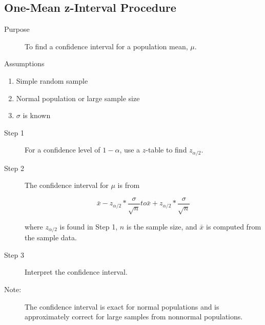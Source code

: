 \documentclass[12pt]{article}
\begin{document}
        \subsection*{One-Mean z-Interval Procedure}
            \begin{description}
                \item[Purpose] To find a confidence interval for a population mean, $\mu$.
                \item[Assumptions]
            \end{description}
            \begin{enumerate}
                \item Simple random sample
                \item Normal population or large sample size
                \item $\sigma$ is known                    
            \end{enumerate}
            \begin{description}
                \item[Step 1] For a confidence level of $1-\alpha$, use a $z$-table to find
                $z_{\alpha/2}$.
                \item[Step 2] The confidence interval for $\mu$ is from
                \begin{center}
                    \[
                        \bar{x}-z_{\alpha/2}*\frac{\sigma}{\sqrt{n}} to 
                        \bar{x}+z_{\alpha/2}*\frac{\sigma}{\sqrt{n}}
                    \]
                \end{center}
                where $z_{\alpha/2}$ is found in Step 1, $n$ is the sample size, and $\bar{x}$
                is computed from the sample data.
                \item[Step 3] Interpret the confidence interval.                    
            \end{description}  
            \begin{description}
                \item[Note:] The confidence interval is exact for normal populations and is
                approximately correct for large samples from nonnormal populations. 
            \end{description}
\end{document}
